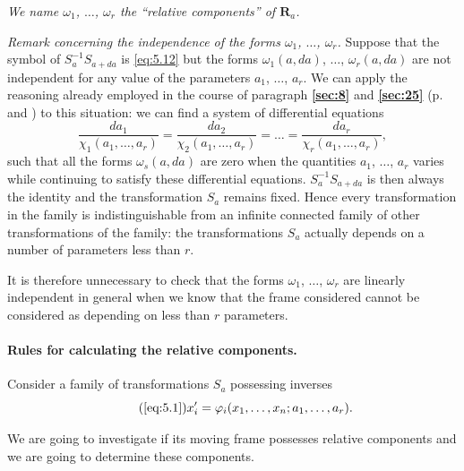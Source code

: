 \documentclass[leqno,11pt]{book}
\makeatletter
\numberwithin{equation}{chapter}
\theoremstyle{shape1}
\theoremstyle{shapesmall}
\let\old@phi\phi
\let\old@varphi\varphi
\let\phi\old@varphi
\let\varphi\old@phi
\newcommand{\fsref}[1]{{\rm\textsection\textbf{\ref{sec:#1}}}}
\newcommand{\somespace}{\vspace{9pt}}
\makeatother
\begin{document}
\emph{We name $\omega_{1}$, $\dots$, $\omega_{r}$ the ``relative components'' of $\mathbf{R}_{a}$.}

\somespace

\emph{Remark concerning the independence of the forms $\omega_{1}$, $\dots$, $\omega_{r}$.} Suppose that the symbol of $S_{a}^{-1}S_{a+da}$ is \eqref{eq:5.12} but the forms $\omega_{1}(a,da)$, $\dots$, $\omega_{r}(a,da)$ are not independent for any value of the parameters $a_{1}$, $\dots$, $a_{r}$. We can apply the reasoning already employed in the course of paragraph \fsref{8} and \fsref{25} (p.~\pageref{sec:8} and \pageref{sec:25}) to this situation: we can find a system of differential equations
\[
\frac{da_{1}}{\chi_{1}(a_{1},\dots,a_{r})}=
\frac{da_{2}}{\chi_{2}(a_{1},\dots,a_{r})}=\dots=
\frac{da_{r}}{\chi_{r}(a_{1},\dots,a_{r})},
\]
such that all the forms $\omega_{s}(a,da)$ are zero when the quantities $a_{1}$, $\dots$, $a_{r}$ varies while continuing to satisfy these differential equations. $S_{a}^{-1}S_{a+da}$ is then always the identity and the transformation $S_{a}$ remains fixed. Hence every transformation in the family is indistinguishable from an infinite connected family of other transformations of the family: the transformations $S_{a}$ actually depends on a number of parameters less than $r$.

It is therefore unnecessary to check that the forms $\omega_{1}$, $\dots$, $\omega_{r}$ are linearly independent in general when we know that the frame considered cannot be considered as depending on less than $r$ parameters. 

\paragraph{Rules for calculating the relative components.}
\label{sec:71}
Consider a family of transformations $S_{a}$ possessing inverses
\begin{equation}
  \label{eq:5.1'}\tag{\ref{eq:5.1}}
  x'_{i}=\phi_{i}(x_{1},\dots,x_{n};a_{1},\dots,a_{r}).
\end{equation}

We are going to investigate if its moving frame possesses relative components and we are going to determine these components.
\end{document}
